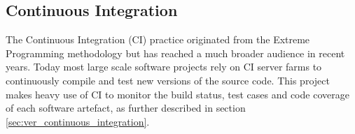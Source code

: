 
\subsection{Continuous Integration}

The Continuous Integration (CI) practice originated from the Extreme Programming methodology \cite{extreme_programming} but has reached a much broader audience in recent years. Today most large scale software projects rely on CI server farms to continuously compile and test new versions of the source code. This project makes heavy use of CI to monitor the build status, test cases and code coverage of each software artefact, as further described in section \ref{sec:ver_continuous_integration}.
